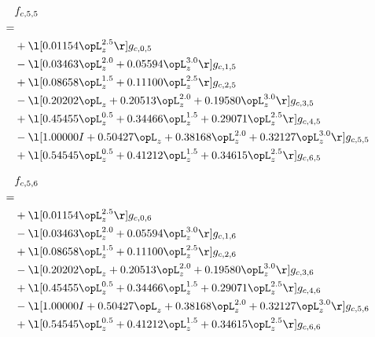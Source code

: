\begin{alignat}{2} 
\label{eq:f_55_0} 
& f_{c,5,5} \nonumber \\ 
 = \\ 
& + \l[  0.01154 \opL_z^{2.5}  \r] g_{c,0,5} \nonumber \\ 
& - \l[  0.03463 \opL_z^{2.0} +  0.05594 \opL_z^{3.0}  \r] g_{c,1,5} \nonumber \\ 
& + \l[  0.08658 \opL_z^{1.5} +  0.11100 \opL_z^{2.5}  \r] g_{c,2,5} \nonumber \\ 
& - \l[  0.20202 \opL_z +  0.20513 \opL_z^{2.0} +  0.19580 \opL_z^{3.0}  \r] g_{c,3,5} \nonumber \\ 
& + \l[  0.45455 \opL_z^{0.5} +  0.34466 \opL_z^{1.5} +  0.29071 \opL_z^{2.5}  \r] g_{c,4,5} \nonumber \\ 
& - \l[  1.00000 I +  0.50427 \opL_z +  0.38168 \opL_z^{2.0} +  0.32127 \opL_z^{3.0}  \r] g_{c,5,5} \nonumber \\ 
& + \l[  0.54545 \opL_z^{0.5} +  0.41212 \opL_z^{1.5} +  0.34615 \opL_z^{2.5}  \r] g_{c,6,5} \nonumber \\ 
\end{alignat} 


\begin{alignat}{2} 
\label{eq:f_56_0} 
& f_{c,5,6} \nonumber \\ 
 = \\ 
& + \l[  0.01154 \opL_z^{2.5}  \r] g_{c,0,6} \nonumber \\ 
& - \l[  0.03463 \opL_z^{2.0} +  0.05594 \opL_z^{3.0}  \r] g_{c,1,6} \nonumber \\ 
& + \l[  0.08658 \opL_z^{1.5} +  0.11100 \opL_z^{2.5}  \r] g_{c,2,6} \nonumber \\ 
& - \l[  0.20202 \opL_z +  0.20513 \opL_z^{2.0} +  0.19580 \opL_z^{3.0}  \r] g_{c,3,6} \nonumber \\ 
& + \l[  0.45455 \opL_z^{0.5} +  0.34466 \opL_z^{1.5} +  0.29071 \opL_z^{2.5}  \r] g_{c,4,6} \nonumber \\ 
& - \l[  1.00000 I +  0.50427 \opL_z +  0.38168 \opL_z^{2.0} +  0.32127 \opL_z^{3.0}  \r] g_{c,5,6} \nonumber \\ 
& + \l[  0.54545 \opL_z^{0.5} +  0.41212 \opL_z^{1.5} +  0.34615 \opL_z^{2.5}  \r] g_{c,6,6} \nonumber \\ 
\end{alignat} 


